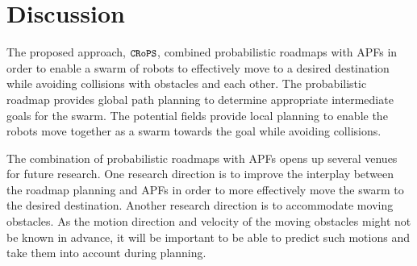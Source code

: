 \documentclass{llncs}
\newcommand{\Acronym}[1]{\ensuremath{{\small{\texttt{#1}}}}}
\newcommand{\Name}{\Acronym{CRoPS}}
\begin{document}
\section{Discussion}

The proposed approach, $\Name$, combined probabilistic roadmaps with
APFs in order to enable a swarm of robots to effectively move to a
desired destination while avoiding collisions with obstacles and each
other.  The probabilistic roadmap provides global path planning to
determine appropriate intermediate goals for the swarm. The potential
fields provide local planning to enable the robots move together as a
swarm towards the goal while avoiding collisions.

The combination of probabilistic roadmaps with APFs opens up several
venues for future research. One research direction is to improve the
interplay between the roadmap planning and APFs in order to more
effectively move the swarm to the desired destination. Another
research direction is to accommodate moving obstacles. As the motion
direction and velocity of the moving obstacles might not be known in
advance, it will be important to be able to predict such motions
and take them into account during planning.





\end{document}
